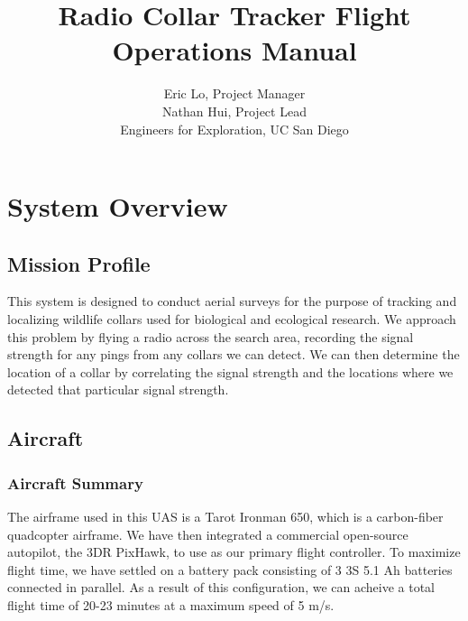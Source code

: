 \documentclass{report}
\title{Radio Collar Tracker Flight Operations Manual}
\author{Eric Lo, Project Manager\\Nathan Hui, Project Lead\\Engineers for Exploration, UC San Diego}
\begin{document}
\maketitle
\tableofcontents
\chapter{System Overview}
	\section{Mission Profile}
		This system is designed to conduct aerial surveys for the purpose of tracking and localizing wildlife collars used for biological and ecological research.  We approach this problem by flying a radio across the search area, recording the signal strength for any pings from any collars we can detect.  We can then determine the location of a collar by correlating the signal strength and the locations where we detected that particular signal strength.
	\section{Aircraft}
		\subsection{Aircraft Summary}
			The airframe used in this UAS is a Tarot Ironman 650, which is a carbon-fiber quadcopter airframe.  We have then integrated a commercial open-source autopilot, the 3DR PixHawk, to use as our primary flight controller.  To maximize flight time, we have settled on a battery pack consisting of 3 3S 5.1 Ah batteries connected in parallel.  As a result of this configuration, we can acheive a total flight time of 20-23 minutes at a maximum speed of 5 m/s.
\end{document}
